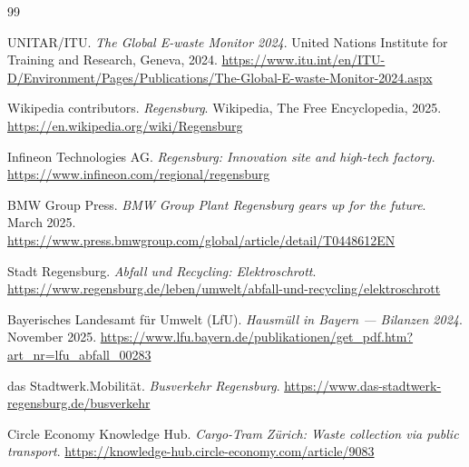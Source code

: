 \documentclass[12pt, a4paper]{article}
\begin{document}
\begin{thebibliography}{99}

UNITAR/ITU.
\textit{The Global E-waste Monitor 2024}.
United Nations Institute for Training and Research, Geneva, 2024.
\url{https://www.itu.int/en/ITU-D/Environment/Pages/Publications/The-Global-E-waste-Monitor-2024.aspx}

Wikipedia contributors.
\textit{Regensburg}.
Wikipedia, The Free Encyclopedia, 2025.
\url{https://en.wikipedia.org/wiki/Regensburg}

Infineon Technologies AG.
\textit{Regensburg: Innovation site and high-tech factory}.
\url{https://www.infineon.com/regional/regensburg}

BMW Group Press.
\textit{BMW Group Plant Regensburg gears up for the future}.
March 2025.
\url{https://www.press.bmwgroup.com/global/article/detail/T0448612EN}

Stadt Regensburg.
\textit{Abfall und Recycling: Elektroschrott}.
\url{https://www.regensburg.de/leben/umwelt/abfall-und-recycling/elektroschrott}

Bayerisches Landesamt für Umwelt (LfU).
\textit{Hausmüll in Bayern --- Bilanzen 2024}.
November 2025.
\url{https://www.lfu.bayern.de/publikationen/get_pdf.htm?art_nr=lfu_abfall_00283}

das Stadtwerk.Mobilität.
\textit{Busverkehr Regensburg}.
\url{https://www.das-stadtwerk-regensburg.de/busverkehr}

Circle Economy Knowledge Hub.
\textit{Cargo-Tram Zürich: Waste collection via public transport}.
\url{https://knowledge-hub.circle-economy.com/article/9083}

\end{thebibliography}
\end{document}
